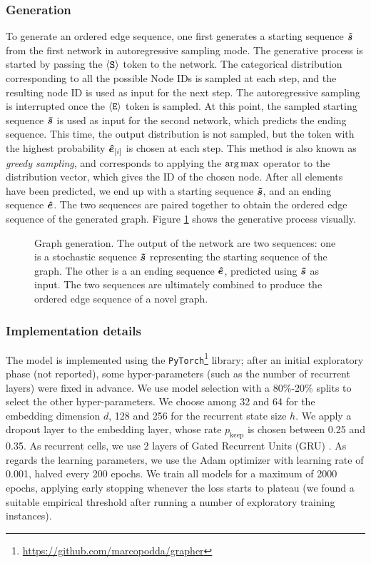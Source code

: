 \subsubsection*{Generation}
To generate an ordered edge sequence, one first generates a starting sequence $\Vector{\tilde{s}}$ from the first network in autoregressive sampling mode. The generative process is started by passing the $\mathtt{\langle S \rangle}$ token to the network. The categorical distribution corresponding to all the possible Node IDs is sampled at each step, and the resulting node ID is used as input for the next step. The autoregressive sampling is interrupted once the $\mathtt{\langle E \rangle}$ token is sampled. At this point, the sampled starting sequence $\Vector{\tilde{s}}$ is used as input for the second network, which predicts the ending sequence. This time, the output distribution is not sampled, but the token with the highest probability $\Elem{\hat{e}}{i}$ is chosen at each step. This method is also known as \emph{greedy sampling}, and corresponds to applying the $\argmax$ operator to the distribution vector, which gives the ID of the chosen node. After all elements have been predicted, we end up with a starting sequence $\Vector{\tilde{s}}$, and an ending sequence $\Vector{\hat{e}}$. The two sequences are paired together to obtain the ordered edge sequence of the generated graph. Figure \ref{fig:model-sampling} shows the generative process visually.
\begin{figure}[h!]
    \centering
    \resizebox{.8\textwidth}{!}{}
    \caption{Graph generation. The output of the network are two sequences: one is a stochastic sequence $\Vector{\tilde{s}}$ representing the starting sequence of the graph. The other is a an ending sequence $\Vector{\hat{e}}$, predicted using $\Vector{\tilde{s}}$ as input. The two sequences are ultimately combined to produce the ordered edge sequence of a novel graph.}
    \label{fig:model-sampling}
\end{figure}

\subsubsection*{Implementation details}\label{sec:implementation}
The model is implemented using the \texttt{PyTorch}\footnote{\url{https://github.com/marcopodda/grapher}} \cite{paszke2017pytorch} library; after an initial exploratory phase (not reported), some hyper-parameters (such as the number of recurrent layers) were fixed in advance. We use model selection with a 80\%-20\% splits to select the other hyper-parameters. We choose among 32 and 64 for the embedding dimension $d$, 128 and 256 for the recurrent state size $h$. We apply a dropout layer to the embedding layer, whose rate $p_{\mathrm{keep}}$ is chosen between 0.25 and 0.35. As recurrent cells, we use 2 layers of Gated Recurrent Units (GRU) \cite{cho2014gru}. As regards the learning parameters, we use the Adam \cite{kingma2015adam} optimizer with learning rate of 0.001, halved every 200 epochs. We train all models for a maximum of 2000 epochs, applying early stopping whenever the loss starts to plateau (we found a suitable empirical threshold after running a number of exploratory training instances).

